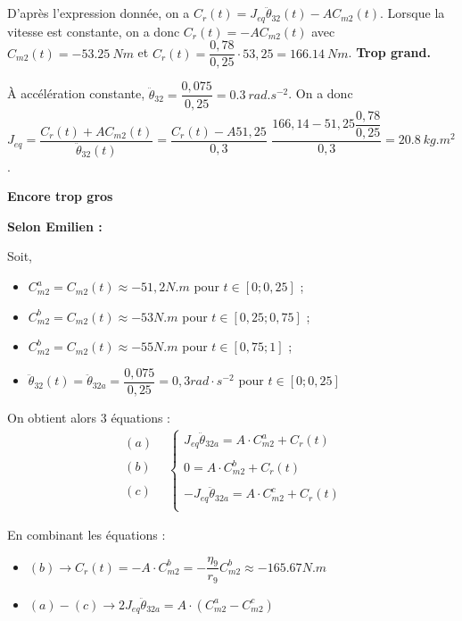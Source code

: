 \documentclass[10pt,fleqn]{article} %
\begin{document}
\subparagraph{}%
D'après l'expression donnée, on a $C_r(t)=J_{eq}\ddot{\theta}_{32}(t)-A C_{m2}(t)$.
Lorsque la vitesse est constante, on a donc $C_r(t)=-A C_{m2}(t)$ avec $C_{m2}(t)=-\SI{53,25}{Nm}$ et 
$C_r(t)= \dfrac{0,78}{0,25} \cdot  53,25  = \SI{166,14}{Nm}$.   \textbf{Trop grand.}


À accélération constante, $\ddot{\theta}_{32} = \dfrac{0,075}{0,25}=\SI{0,3}{rad.s^{-2}}$. On a donc 
$J_{eq}=\dfrac{C_r(t)+A C_{m2}(t)}{\ddot{\theta}_{32}(t)}=\dfrac{C_r(t)-A 51,25}{0,3}$ 
$\dfrac{166,14  -51,25\dfrac{0,78}{0,25}}{0,3}=\SI{20,8}{kg.m^2}$. 


\textbf{Encore trop gros}

\textbf{Selon Emilien :}

Soit,
\begin{itemize}
\item $C^{a}_{m2}=C_{m2}(t)\approx-51,2N.m$ pour $t\in\left[0;0,25\right]$ ;
\item $C^{b}_{m2}=C_{m2}(t)\approx-53N.m$ pour $t\in\left[0,25;0,75\right]$ ;
\item $C^{b}_{m2}=C_{m2}(t)\approx-55N.m$ pour $t\in\left[0,75;1\right]$ ;
\item $\ddot{\theta}_{32}(t)=\ddot{\theta}_{32a}=\dfrac{0,075}{0,25}=0,3rad\cdot s^{-2}$ pour $t\in \left[0;0,25\right]$
\end{itemize}

On obtient alors 3 équations : 
\begin{align*}
\begin{array}{c}
(a)\\
\\
(b)\\
\\
(c)\\
\end{array}
&
\left\{
\begin{array}{c}
J_{eq}\ddot{\theta}_{32a}=A\cdot C^{a}_{m2}+C_r(t)\\
\\
0=A\cdot C^{b}_{m2}+C_r(t)\\
\\
-J_{eq}\ddot{\theta}_{32a}=A\cdot C^{c}_{m2}+C_r(t)\\
\end{array}
\right.
\end{align*}

En combinant les équations : 
\begin{itemize}
\item $(b) \rightarrow C_r(t)=-A\cdot  C^{b}_{m2}=-\dfrac{\eta_9}{r_9}C^{b}_{m2}\approx -165.67 N.m$
\item $(a)-(c)\rightarrow 2 J_{eq} \ddot{\theta}_{32a}=A\cdot \left(C^{a}_{m2}-C^{c}_{m2}\right)$
\end{itemize}
\end{document}
